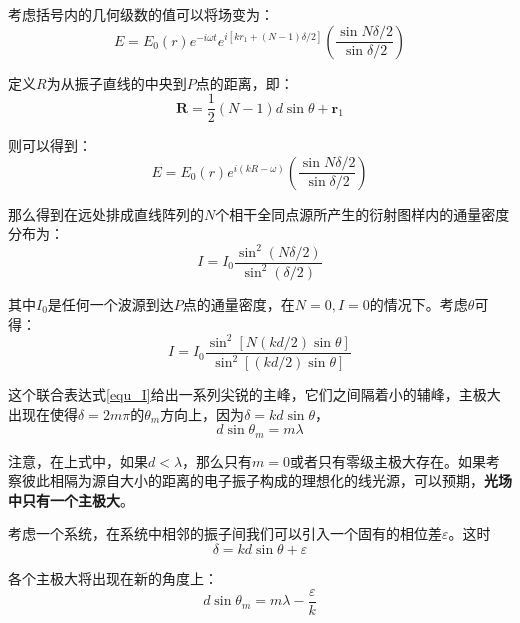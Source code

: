 \documentclass[UTF8]{ctexart}
\begin{document}
	考虑括号内的几何级数的值可以将场变为：
	\begin{equation}
	E=E_{0}(r) e^{-i \omega t} e^{i\left[k r_{1}+(N-1) \delta / 2\right]}\left(\frac{\sin N \delta / 2}{\sin \delta / 2}\right)
	\end{equation}
	
\noindent 定义$ R $为从振子直线的中央到$ P $点的距离，即：
\begin{equation}
\boldsymbol{R}=\frac{1}{2}(N-1) d \sin \theta+\boldsymbol{r}_{1}
\end{equation}

\noindent 则可以得到：
\begin{equation}
E=E_{0}(r) e^{i(k R-\omega)}\left(\frac{\sin N \delta / 2}{\sin \delta / 2}\right)
\end{equation}

\noindent 那么得到在远处排成直线阵列的$ N $个相干全同点源所产生的衍射图样内的通量密度分布为：
\begin{equation}
I=I_{0} \frac{\sin ^{2}(N \delta / 2)}{\sin ^{2}(\delta / 2)}
\end{equation}

\noindent 其中$ I_{0} $是任何一个波源到达$ P $点的通量密度，在$ N=0,I=0 $的情况下。考虑$ \theta $可得：
\begin{equation}
I=I_{0} \frac{\sin ^{2}[N(k d / 2) \sin \theta]}{\sin ^{2}[(k d / 2) \sin \theta]}\label{equ_I}
\end{equation}

	这个联合表达式\ref{equ_I}给出一系列尖锐的主峰，它们之间隔着小的辅峰，主极大出现在使得$ \delta=2 m \pi $的$ \theta_{m} $方向上，因为$ \delta = k d \sin \theta $，
	\begin{equation}
		d \sin \theta_{m}=m \lambda
	\end{equation}
	
\noindent 注意，在上式中，如果$ d<\lambda $，那么只有$ m=0 $或者只有零级主极大存在。如果考察彼此相隔为源自大小的距离的电子振子构成的理想化的线光源，可以预期，\textbf{光场中只有一个主极大}。

	考虑一个系统，在系统中相邻的振子间我们可以引入一个固有的相位差$ \varepsilon $。这时
	\begin{equation}
		\delta =k d \sin \theta + \varepsilon
	\end{equation}
	
\noindent 各个主极大将出现在新的角度上：
\begin{equation}
	d \sin \theta_{m} = m \lambda - \frac{\varepsilon}{k}
\end{equation}
\end{document}
